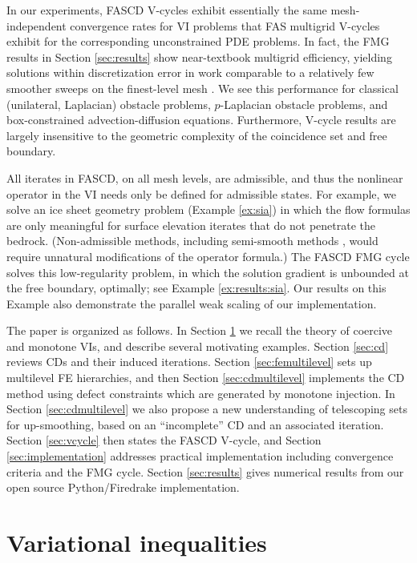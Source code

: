 \documentclass[review,hidelinks,onefignum,onetabnum,final]{siamart220329}  %
\begin{document}
In our experiments, FASCD V-cycles exhibit essentially the same mesh-independent convergence rates for VI problems that FAS multigrid V-cycles exhibit for the corresponding unconstrained PDE problems.  In fact, the FMG results in Section \ref{sec:results} show near-textbook multigrid efficiency, yielding solutions within discretization error in work comparable to a relatively few smoother sweeps on the finest-level mesh \cite{BrandtLivne2011}.  We see this performance for classical (unilateral, Laplacian) obstacle problems, $p$-Laplacian obstacle problems, and box-constrained advection-diffusion equations.  Furthermore, V-cycle results are largely insensitive to the geometric complexity of the coincidence set and free boundary.

All iterates in FASCD, on all mesh levels, are admissible, and thus the nonlinear operator in the VI needs only be defined for admissible states.  For example, we solve an ice sheet geometry problem (Example \ref{ex:sia}) in which the flow formulas are only meaningful for surface elevation iterates that do not penetrate the bedrock.  (Non-admissible methods, including semi-smooth methods \cite{BensonMunson2006}, would require unnatural modifications of the operator formula.)  The FASCD FMG cycle solves this low-regularity problem, in which the solution gradient is unbounded at the free boundary, optimally; see Example \ref{ex:results:sia}.  Our results on this Example also demonstrate the parallel weak scaling \cite{Bueler2021} of our implementation.

The paper is organized as follows.  In Section \ref{sec:vi} we recall the theory of coercive and monotone VIs, and describe several motivating examples.  Section \ref{sec:cd} reviews CDs and their induced iterations.  Section \ref{sec:femultilevel} sets up multilevel FE hierarchies, and then Section \ref{sec:cdmultilevel} implements the CD method using defect constraints which are generated by monotone injection.  In Section \ref{sec:cdmultilevel} we also propose a new understanding of telescoping sets for up-smoothing, based on an ``incomplete'' CD and an associated iteration.  Section \ref{sec:vcycle} then states the FASCD V-cycle, and Section \ref{sec:implementation} addresses practical implementation including convergence criteria and the FMG cycle.  Section \ref{sec:results} gives numerical results from our open source Python/Firedrake \cite{Rathgeberetal2016} implementation.


\section{Variational inequalities} \label{sec:vi}
\end{document}
